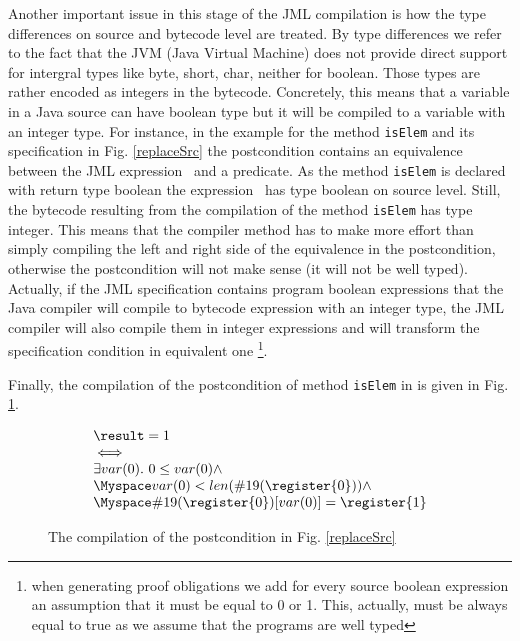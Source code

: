 \begin{enumerate}
Another important issue in this stage of the JML compilation is how the type differences on source and bytecode level are treated. 
By type differences we refer to the fact that the JVM (Java Virtual Machine) does not provide direct support for intergral types like byte, short, char, neither for boolean. Those types are rather encoded as integers in the bytecode. Concretely, this means that a variable in a Java source can have boolean type but it will be compiled to a variable with
an integer type.%
 For instance, in the example for the method 
\texttt{isElem} and its specification in Fig. \ref{replaceSrc}  the postcondition contains an equivalence between the JML expression  
\result \ and a predicate. As the method \texttt{isElem} is declared with return type boolean the expression \result \ has type boolean on source level. 
Still, the bytecode resulting from the compilation of the method  \texttt{isElem} has type integer. This means that the compiler method has to make
 more effort than simply compiling the left and right side of the equivalence in the postcondition, otherwise the postcondition will not make sense
 (it will not be well typed). Actually, 
if the JML specification contains program boolean expressions that the Java compiler will compile to bytecode expression with an integer type, the JML compiler 
will also compile them in integer expressions and will transform the specification condition in equivalent one 
\footnote{when generating proof obligations we add for every source boolean expression an assumption that it must be equal to 0 or 1. This, actually, must be always
equal to true as we assume that the programs are well typed}.  

Finally, the compilation of the postcondition of method \texttt{isElem} in  is given in Fig. \ref{postCompile}.
\begin{figure}[tb]
 $$\begin{array}{l}
         \result = 1 \\
         \iff \\ 
         \exists  var(0) . \ 0 \leq var(0) \wedge \\
         \Myspace var(0) < len(\#19(\register{0})) \wedge\\
         \Myspace  \#19(\register{0})[var(0)] = \register{1}  
   \end{array}
$$
\caption{The compilation of the postcondition in Fig. \ref{replaceSrc}}
\label{postCompile}
\end{figure}


\end{enumerate}
